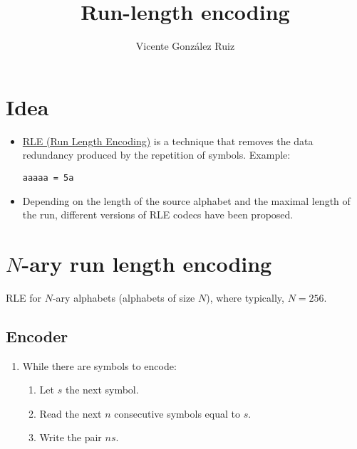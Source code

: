 
\title{Run-length encoding}

\author{Vicente González Ruiz}

\maketitle

\section{Idea}

\begin{itemize}
\item \href{https://en.wikipedia.org/wiki/Run-length_encoding}{RLE (Run Length Encoding)} is a technique that removes the data redundancy produced by the repetition of symbols. Example:

\begin{verbatim}
aaaaa = 5a
\end{verbatim}

\item Depending on the length of the source alphabet and the maximal
  length of the run, different versions of RLE codecs have been
  proposed.
\end{itemize}

\section{$N$-ary run length encoding}

RLE for \(N\)-ary alphabets (alphabets of size \(N\)), where typically,
\(N=256\).

\subsection{Encoder}

\begin{enumerate}
\item While there are symbols to encode:
  \tightlist
  \begin{enumerate}
  \tightlist
  \item Let \(s\) the next symbol.
  \item Read the next \(n\) consecutive symbols equal to \(s\).
  \item Write the pair \(ns\).
  \end{enumerate}
\end{enumerate}

